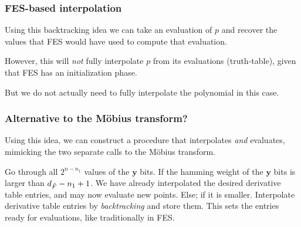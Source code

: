 \documentclass{beamer}
\begin{document}
\begin{frame}
    \frametitle{FES-based interpolation}
    Using this backtracking idea we can take an evaluation of $p$ and recover the values that FES would have used to compute that evaluation.

    \pause 

    However, this will \textit{not} fully interpolate $p$ from its evaluations (truth-table), given that FES has an initialization phase.

    \pause

    But we do not actually need to fully interpolate the polynomial in this case.
\end{frame}

\begin{frame}
    \frametitle{Alternative to the Möbius transform?}
    Using this idea, we can construct a procedure that interpolates \textit{and} evaluates, mimicking the two separate calls to the Möbius transform.

    \begin{outline}
        \1 Go through all $2^{n - n_1}$ values of the $\mathbf{y}$ bits.
            \2 If the hamming weight of the $\mathbf{y}$ bits is larger than $d_{\Tilde{F}} - n_1 + 1$.
                \3 We have already interpolated the desired derivative table entries, and may now evaluate new points.
            \2 Else; if it is smaller.
                \3 Interpolate derivative table entries by \textit{backtracking} and store them. This sets the entries ready for evaluations, like traditionally in FES.
    \end{outline}
\end{frame}
\end{document}
